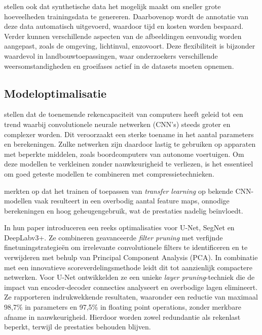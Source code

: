 \textcite{Anderson2022} stellen ook dat synthetische data het mogelijk maakt om sneller grote hoeveelheden trainingsdata te genereren. Daarbovenop wordt de annotatie van deze data automatisch uitgevoerd, waardoor tijd en kosten worden bespaard. Verder kunnen verschillende aspecten van de afbeeldingen eenvoudig worden aangepast, zoals de omgeving, lichtinval, enzovoort. Deze flexibiliteit is bijzonder waardevol in landbouwtoepassingen, waar onderzoekers verschillende weersomstandigheden en groeifases actief in de datasets moeten opnemen.

\subsection{Modeloptimalisatie}
\textcite{LopezGonzalez2024} stellen dat de toenemende rekencapaciteit van computers heeft geleid tot een trend waarbij convolutionele neurale netwerken (CNN’s) steeds groter en complexer worden. Dit veroorzaakt een sterke toename in het aantal parameters en berekeningen. Zulke netwerken zijn daardoor lastig te gebruiken op apparaten met beperkte middelen, zoals boordcomputers van autonome voertuigen. Om deze modellen te verkleinen zonder nauwkeurigheid te verliezen, is het essentieel om goed geteste modellen te combineren met compressietechnieken.

\textcite{Denil2013} merkten op dat het trainen of toepassen van \textit{transfer learning} op bekende CNN-modellen vaak resulteert in een overbodig aantal feature maps, onnodige berekeningen en hoog geheugengebruik, wat de prestaties nadelig beïnvloedt.

In hun paper introduceren \textcite{LopezGonzalez2024} een reeks optimalisaties voor U-Net, SegNet en DeepLabv3+. Ze combineren geavanceerde \textit{filter pruning} met verfijnde finetuningstrategieën om irrelevante convolutionele filters te identificeren en te verwijderen met behulp van Principal Component Analysis (PCA). In combinatie met een innovatieve scoreverdelingsmethode leidt dit tot aanzienlijk compactere netwerken. Voor U-Net ontwikkelden ze een unieke \textit{layer pruning}-techniek die de impact van encoder-decoder connecties analyseert en overbodige lagen elimineert. Ze rapporteren indrukwekkende resultaten, waaronder een reductie van maximaal 98,7\% in parameters en 97,5\% in floating point operations, zonder merkbare afname in nauwkeurigheid. Hierdoor worden zowel redundantie als rekenlast beperkt, terwijl de prestaties behouden blijven.

